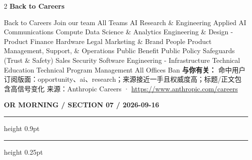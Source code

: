 \documentclass[10.5pt]{ctexart}
\begin{document}
\begin{multicols}{2}
\vspace{2mm}
{\large\bfseries Back to Careers}\par
Back to Careers Join our team All Teams AI Research \& Engineering Applied AI Communications Compute Data Science \& Analytics Engineering \& Design - Product Finance Hardware Legal Marketing \& Brand People Product Management, Support, \& Operations Public Benefit Public Policy Safeguards (Trust \& Safety) Sales Security Software Engineering - Infrastructure Technical Education Technical Program Management All Offices Ban
\textbf{与你有关：} 命中用户订阅版面：opportunity、ai、research；来源接近一手且权威度高；标题/正文包含高信号变化
{\footnotesize\color{ormuted} 来源：Anthropic Careers · \url{https://www.anthropic.com/careers}}
\end{multicols}
\newpage
{\small\bfseries OR MORNING / SECTION 07 / 2026-09-16}
\vspace{2mm}
\hrule height 0.9pt
\vspace{1.5mm}
\hrule height 0.25pt
\vspace{4mm}
\end{document}
